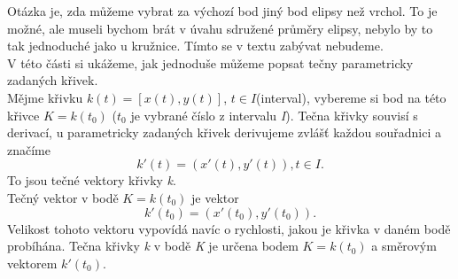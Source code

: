 		Otázka je, zda můžeme vybrat za výchozí bod jiný bod elipsy než vrchol. To je možné, ale museli bychom brát v úvahu sdružené
		průměry elipsy, nebylo by to tak jednoduché jako u kružnice. Tímto se v textu zabývat nebudeme. \\[10pt]
		V této části si ukážeme, jak jednoduše můžeme popsat tečny parametricky zadaných křivek. \\
		Mějme křivku $k(t)=[x(t), y(t)]$, $t \in I$(interval), vybereme si bod na této křivce $K=k(t_0)$ ($t_0$ je vybrané číslo z intervalu \textit{I}).
		Tečna křivky souvisí s derivací, u parametricky zadaných křivek derivujeme zvlášť každou souřadnici a značíme
		$$k'(t)=(x'(t), y'(t)), t \in I.$$
		To jsou tečné vektory křivky \textit{k}. \\
		Tečný vektor v bodě $K=k(t_0)$ je vektor
		$$k'(t_0)=(x'(t_0), y'(t_0)).$$
		Velikost tohoto vektoru vypovídá navíc o rychlosti, jakou je křivka v daném bodě probíhána. Tečna křivky \textit{k} v bodě \textit{K}
		je určena bodem $K=k(t_0)$ a směrovým vektorem $k'(t_0)$.
		\clearpage
